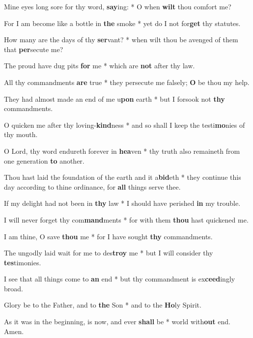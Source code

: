 \begin{multicols}{2}
	Mine eyes long sore for thy word, \textbf{say}ing: * O when \textbf{wilt} thou comfort me?
	
	For I am become like a bottle in \textbf{the} smoke * yet do I not for\textbf{get} thy statutes.
	
	How many are the days of thy \textbf{ser}vant? * when wilt thou be avenged of them that \textbf{per}secute me?
	
	The proud have dug pits \textbf{for} me * which are \textbf{not} after thy law.
	
	All thy commandments \textbf{are} true * they persecute me falsely; \textbf{O} be thou my help.
	
	They had almost made an end of me u\textbf{pon} earth * but I forsook not \textbf{thy} commandments.
	
	O quicken me after thy loving-\textbf{kind}ness * and so shall I keep the testi\textbf{mo}nies of thy mouth.
	
	O Lord, thy word endureth forever in \textbf{hea}ven * thy truth also remaineth from one generation \textbf{to} another.
	
	Thou hast laid the foundation of the earth and it a\textbf{bid}eth * they continue this day according to thine ordinance, for \textbf{all} things serve thee.
	
	If my delight had not been in \textbf{thy} law * I should have perished \textbf{in} my trouble.
	
	I will never forget thy com\textbf{mand}ments * for with them \textbf{thou} hast quickened me.
	
	I am thine, O save \textbf{thou} me * for I have sought \textbf{thy} commandments.
	
	The ungodly laid wait for me to des\textbf{troy} me * but I will consider thy \textbf{tes}timonies.
	
	I see that all things come to \textbf{an} end * but thy commandment is ex\textbf{ceed}ingly broad.
	
	Glory be to the Father, and to \textbf{the} Son * and to the \textbf{Ho}ly Spirit.
	
	As it was in the beginning, is now, and ever \textbf{shall} be * world with\textbf{out} end. Amen.
\end{multicols}